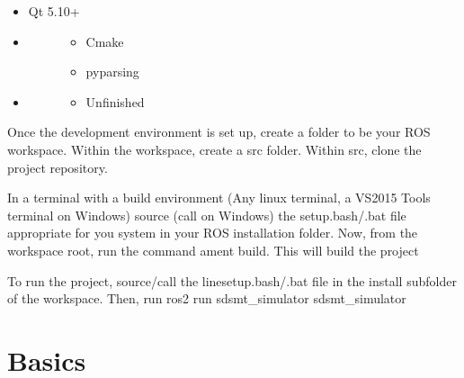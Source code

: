 \documentclass[letterpaper,10pt,english]{sphinxmanual}
\begin{document}
\begin{itemize}
\item {} 
Qt 5.10+

\item {} \begin{description}
\item[{}] \leavevmode\begin{itemize}
\item {} 
Cmake

\item {} 
pyparsing

\end{itemize}

\end{description}

\item {} \begin{description}
\item[{}] \leavevmode\begin{itemize}
\item {} 
Unfinished

\end{itemize}

\end{description}

\end{itemize}


Once the development environment is set up, create a folder to be your ROS workspace.
Within the workspace, create a src folder. Within src, clone the
project repository.


In a terminal with a build environment (Any linux terminal, a VS2015 Tools terminal on
Windows) source (call on Windows) the setup.bash/.bat file appropriate for you system in
your ROS installation folder. Now, from the workspace root, run the command ament build.
This will build the project


To run the project, source/call the line\textbar{}setup.bash/.bat file in the install subfolder
of the workspace. Then, run ros2 run sdsmt\_simulator sdsmt\_simulator


\chapter{Basics}
\label{\detokenize{index:basics}}
\end{document}
